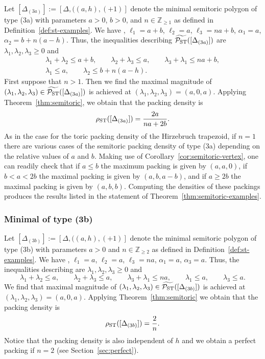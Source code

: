 \documentclass[pdftex]{sigma}
\numberwithin{equation}{section}
\def\Z{{\mathbb Z}}
\newcommand{\De}{\Delta}
\newcommand{\PSTtilde}{\widetilde{\mathcal{P}_{\rm ST}}}
\begin{document}
Let $[\De_{(3a)}]:=[\De,((a,h),(+1)]$ denote the minimal semitoric polygon of type (3a) with parameters $a>0$, $b>0$, and $n\in\Z_{\geq 1}$ as defined in Definition~\ref{def:st-examples}. We have \smash{$\textrm{area}(\De) = \frac{(na+2b)a}{2}$}, $\ell_1 = a+b$, $\ell_2 = a$, $\ell_3 = na+b$, $\alpha_1 = a$, $\alpha_2 = b+n(a-h)$. Thus, the inequalities describing $\PSTtilde([\De_{(3a)}])$ are $\lambda_1,\lambda_2,\lambda_3\geq 0$ and
\begin{gather*}
\lambda_1+\lambda_2 \leq a+b,\qquad
 \lambda_2+\lambda_3 \leq a,\qquad
 \lambda_3+\lambda_1 \leq na+b,\\
 \lambda_1 \leq a,\qquad
 \lambda_2 \leq b+n(a-h).
\end{gather*}
First suppose that $n>1$. Then we find the maximal magnitude of $(\lambda_1,\lambda_2,\lambda_3)\in\PSTtilde([\De_{(3a)}])$ is achieved at $(\lambda_1,\lambda_2,\lambda_3) = (a,0,a)$. Applying Theorem~\ref{thm:semitoric}, we obtain that the packing density is
\begin{equation}\label{eqn:stpack-3a}
\rho_{{\rm ST}} ([\De_{(3a)}]) = \frac{2a}{na+2b}.
\end{equation}
As in the case for the toric packing density of the Hirzebruch trapezoid, if $n=1$ there are various cases of the semitoric packing density of type (3a) depending on the relative values of $a$ and $b$.
Making use of Corollary~\ref{cor:semitoric-vertex}, one can readily check that if $a\leq b$ the maximum packing is given by $(a,a,0)$, if $b<a<2b$ the maximal packing is given by $(a, b, a-b)$, and if $a\geq 2b$ the maximal packing is given by $(a,b,b)$. Computing the densities of these packings produces the results listed in the statement of Theorem~\ref{thm:semitoric-examples}.

\subsubsection{Minimal of type (3b)}
Let $[\De_{(3b)}]:=[\De,((a,h),(+1)]$ denote the minimal semitoric polygon of type (3b) with parameters $a>0$ and $n\in\Z_{\geq 2}$ as defined in Definition~\ref{def:st-examples}. We have \smash{$\textrm{area}(\De) = \frac{na^2}{2}$}, $\ell_1 = a$, $\ell_2 = a$, $\ell_3 = na$, $\alpha_1 = a$, $\alpha_3 = a$. Thus, the inequalities describing \smash{$\PSTtilde([\De_{(3b)}])$} are $\lambda_1,\lambda_2,\lambda_3\geq 0$ and
\begin{equation*}
\lambda_1+\lambda_2 \leq a,\qquad
 \lambda_2+\lambda_3 \leq a,\qquad
 \lambda_3+\lambda_1 \leq na,\qquad
 \lambda_1 \leq a,\qquad
 \lambda_3 \leq a.
\end{equation*}
We find that maximal magnitude of $(\lambda_1,\lambda_2,\lambda_3)\in\PSTtilde([\De_{(3b)}])$ is achieved at $(\lambda_1,\lambda_2,\lambda_3) = (a,0,a)$. Applying Theorem~\ref{thm:semitoric} we obtain that the packing density is
\begin{equation}\label{eqn:stpack-3b}
\rho_{{\rm ST}} ([\De_{(3b)}]) = \frac{2}{n}.
\end{equation}
Notice that the packing density is also independent of $h$ and we obtain a perfect packing if $n=2$ (see Section~\ref{sec:perfect}).
\end{document}
